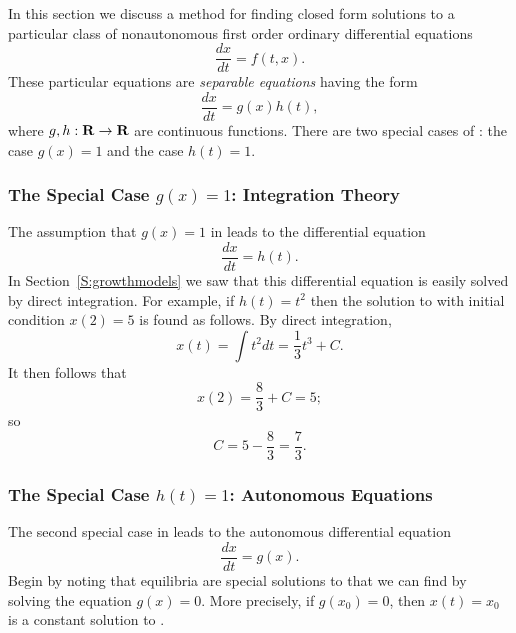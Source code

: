 \label{sec:sov} 

In this section we discuss a method for finding closed form solutions to
a particular class of nonautonomous first order ordinary differential 
equations 
\begin{equation}  \label{e:nonauto}
\frac{dx}{dt} = f(t,x).
\end{equation}
These particular equations are {\em separable equations\/} having the form 
\begin{equation}  \label{eq:gh}
\frac{dx}{dt} = g(x) h(t),
\end{equation}
where $g,h:\mbox{$\bf{R}$}\to\mbox{$\bf{R}$}$ are continuous functions.   There are two special cases 
of : the case $g(x)=1$ and the case $h(t)=1$.  

\subsubsection*{The Special Case $g(x)=1$: Integration Theory}

The assumption that $g(x)=1$ in  leads to the differential 
equation 
\begin{equation}  \label{e:g=1}
\frac{dx}{dt} = h(t).
\end{equation}
In Section~\ref{S:growthmodels} we saw that this differential equation  
is easily solved by direct integration.  For example, if $h(t)=t^2$ then 
the solution to  with initial condition $x(2)=5$ is found as
follows.  By direct integration,
\[
x(t) = \int t^2 dt = \frac{1}{3}t^3 + C.
\]
It then follows that
\[
x(2) = \frac{8}{3} + C = 5;
\]
so 
\[
C = 5 - \frac{8}{3} = \frac{7}{3}.
\]


\subsubsection*{The Special Case $h(t)=1$: Autonomous Equations}

The second special case in  leads to the autonomous 
differential equation
\begin{equation}  \label{e:h=1}
\frac{dx}{dt} = g(x).
\end{equation}
Begin by noting that equilibria are special solutions to  that we 
can find by solving the equation $g(x)=0$.  More precisely, if $g(x_0)=0$, 
then $x(t)=x_0$ is a constant solution to .  

